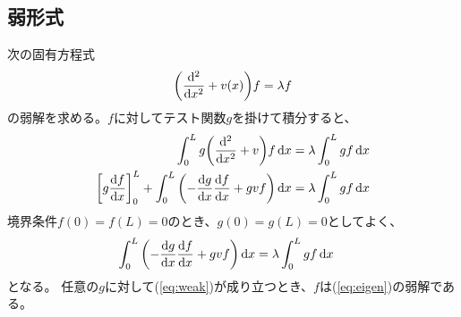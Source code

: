 \documentclass[xelatex,ja=standard]{bxjsarticle}
\begin{document}
\subsection{弱形式}
次の固有方程式
\begin{align}
    \qty(\dv[2]{x} + v(x))f = \lambda f\label{eq:eigen}
\end{align}
の弱解を求める。$f$に対してテスト関数$g$を掛けて積分すると、
\begin{align}
    \int_0^Lg\qty(\dv[2]{x} + v)f\dd{x} &= \lambda\int_0^Lgf\dd{x}\notag\\
    \qty[g\dv{f}{x}]_0^L+\int_0^L\qty(-\dv{g}{x}\dv{f}{x} + gvf)\dd{x}
     &= \lambda\int_0^Lgf\dd{x}
\end{align}
境界条件$f(0) = f(L) = 0$のとき、$g(0) = g(L) = 0$としてよく、
\begin{align}
    \int_0^L\qty(-\dv{g}{x}\dv{f}{x} + gvf)\dd{x}
     &= \lambda\int_0^Lgf\dd{x}\label{eq:weak}
\end{align}
となる。  任意の$g$に対して(\ref{eq:weak})が成り立つとき、$f$は(\ref{eq:eigen})の弱解である。
\end{document}
